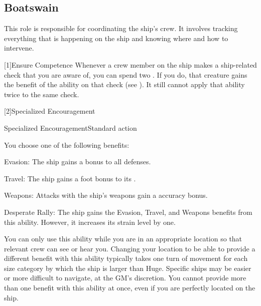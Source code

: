 
  \subsection{Boatswain}
    This role is responsible for coordinating the ship's crew.
    It involves tracking everything that is happening on the ship and knowing where and how to intervene.

    [1]{Ensure Competence} Whenever a crew member on the ship makes a ship-related check that you are aware of, you can spend two .
      If you do, that creature gains the benefit of the  ability on that check (see ).
      It still cannot apply that ability twice to the same check.

    [2]{Specialized Encouragement}
      \begin{activeability}{Specialized Encouragement}{Standard action}
        \rankline

        You choose one of the following benefits:
        \begin{raggeditemize}
          \item Evasion: The ship \briefly gains a  bonus to all defenses.
          \item Travel: The ship \briefly gains a  foot bonus to its .
          \item Weapons: Attacks with the ship's weapons \briefly gain a  accuracy bonus.
          \item Desperate Rally: The ship \briefly gains the Evasion, Travel, and Weapons benefits from this ability.
            However, it increases its strain level by one.
        \end{raggeditemize}

        You can only use this ability while you are in an appropriate location so that relevant crew can see or hear you.
        Changing your location to be able to provide a different benefit with this ability typically takes one turn of movement for each size category by which the ship is larger than Huge.
        Specific ships may be easier or more difficult to navigate, at the GM's discretion.
        You cannot provide more than one benefit with this ability at once, even if you are perfectly located on the ship.
      \end{activeability}

